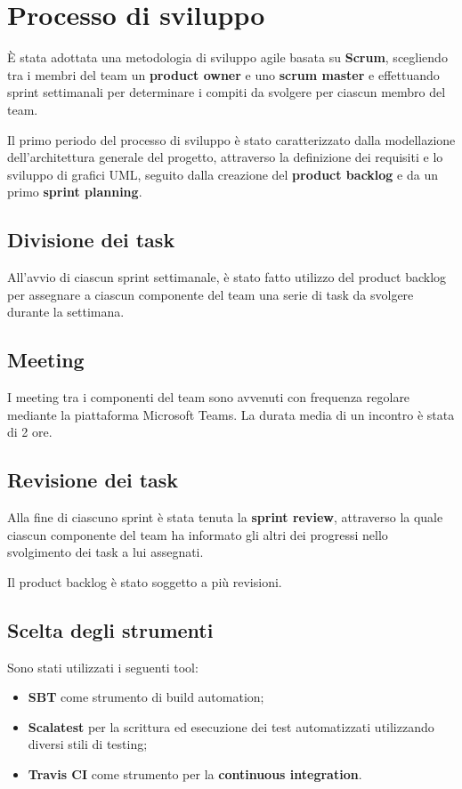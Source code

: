 \section{Processo di sviluppo}
È stata adottata una metodologia di sviluppo agile basata su \textbf{Scrum}, scegliendo tra i membri del team un \textbf{product owner} e uno \textbf{scrum master} e effettuando sprint settimanali per determinare i compiti da svolgere per ciascun membro del team.

Il primo periodo del processo di sviluppo è stato caratterizzato dalla modellazione dell'architettura generale del progetto, attraverso la definizione dei requisiti e lo sviluppo di grafici UML, seguito dalla creazione del \textbf{product backlog} e da un primo \textbf{sprint planning}.

\subsection{Divisione dei task}
All'avvio di ciascun sprint settimanale, è stato fatto utilizzo del product backlog per assegnare a ciascun componente del team una serie di task da svolgere durante la settimana.

\subsection{Meeting}
I meeting tra i componenti del team sono avvenuti con frequenza regolare mediante la piattaforma Microsoft Teams. La durata media di un incontro è stata di 2 ore.

\subsection{Revisione dei task}
Alla fine di ciascuno sprint è stata tenuta la \textbf{sprint review}, attraverso la quale ciascun componente del team ha informato gli altri dei progressi nello svolgimento dei task a lui assegnati.

Il product backlog è stato soggetto a più revisioni.

\subsection{Scelta degli strumenti}
Sono stati utilizzati i seguenti tool:

\begin{itemize}
    \item \textbf{SBT} come strumento di build automation;
    \item \textbf{Scalatest} per la scrittura ed esecuzione dei test automatizzati utilizzando diversi stili di testing;
    \item \textbf{Travis CI} come strumento per la \textbf{continuous integration}.
\end{itemize}